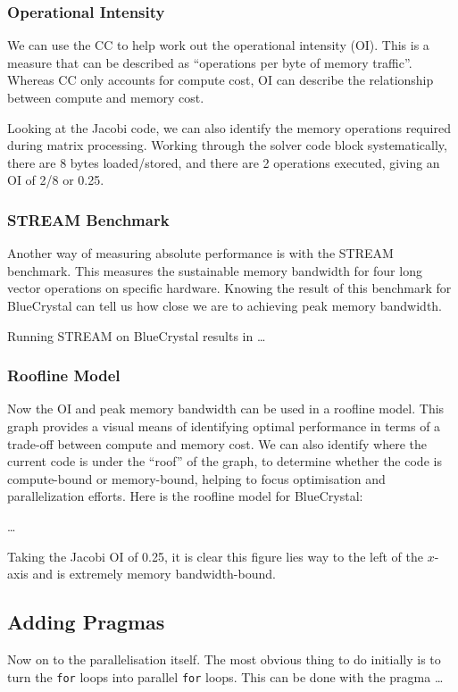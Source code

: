 \documentclass{article}
\begin{document}
\subsubsection{Operational Intensity}
We can use the CC to help work out the operational intensity
(OI). This is a measure that can be described as ``operations per byte
of memory traffic''. Whereas CC only accounts for compute cost, OI can
describe the relationship between compute and memory cost.

Looking at the Jacobi code, we can also identify the memory operations
required during matrix processing. Working through the solver code
block systematically, there are 8 bytes loaded/stored, and there are 2
operations executed, giving an OI of 2/8 or 0.25.

\subsubsection{STREAM Benchmark}
Another way of measuring absolute performance is with the STREAM
benchmark. This measures the sustainable memory bandwidth for four
long vector operations on specific hardware. Knowing the result of
this benchmark for BlueCrystal can tell us how close we are to
achieving peak memory bandwidth.

Running STREAM on BlueCrystal results in \ldots

\subsubsection{Roofline Model}
Now the OI and peak memory bandwidth can be used in a roofline
model. This graph provides a visual means of identifying optimal
performance in terms of a trade-off between compute and memory
cost. We can also identify where the current code is under the
``roof'' of the graph, to determine whether the code is compute-bound
or memory-bound, helping to focus optimisation and parallelization
efforts. Here is the roofline model for BlueCrystal:

\ldots

Taking the Jacobi OI of 0.25, it is clear this figure lies way to the
left of the \(x\)-axis and is extremely memory bandwidth-bound.

\subsection{Adding Pragmas}
Now on to the parallelisation itself. The most obvious thing to do
initially is to turn the \texttt{for} loops into parallel \texttt{for}
loops. This can be done with the pragma \ldots
\end{document}
